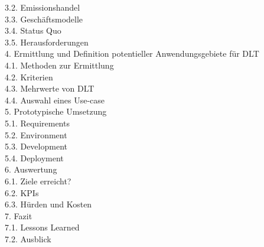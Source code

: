 3.2. Emissionshandel\\
3.3. Geschäftsmodelle\\
3.4. Status Quo\\
3.5. Herausforderungen\\
4. Ermittlung und Definition potentieller Anwendungsgebiete für DLT\\
4.1. Methoden zur Ermittlung\\
4.2. Kriterien\\
4.3. Mehrwerte von DLT\\
4.4. Auswahl eines Use-case\\
5. Prototypische Umsetzung\\
5.1. Requirements\\
5.2. Environment\\
5.3. Development\\
5.4. Deployment\\
6. Auswertung\\
6.1. Ziele erreicht?\\
6.2. KPIs\\
6.3. Hürden und Kosten\\
7. Fazit\\
7.1. Lessons Learned\\
7.2. Ausblick\\

\newpage